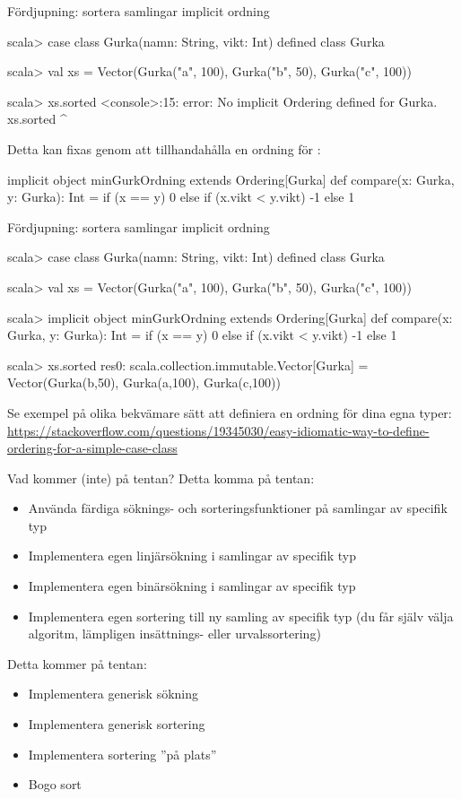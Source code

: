 \begin{Slide}{Fördjupning: sortera samlingar implicit ordning}
\begin{REPL}
scala> case class Gurka(namn: String, vikt: Int)
defined class Gurka

scala> val xs = Vector(Gurka("a", 100), Gurka("b", 50), Gurka("c", 100))

scala> xs.sorted
<console>:15: error: No implicit Ordering defined for Gurka.
       xs.sorted
          ^
\end{REPL}
\pause
Detta kan fixas genom att tillhandahålla en  ordning för :
\begin{Code}
implicit object minGurkOrdning extends Ordering[Gurka] {
  def compare(x: Gurka, y: Gurka): Int =
    if (x == y) 0
    else if (x.vikt < y.vikt) -1
    else 1
}
\end{Code}
\end{Slide}


\begin{Slide}{Fördjupning: sortera samlingar implicit ordning}
\begin{REPL}
scala> case class Gurka(namn: String, vikt: Int)
defined class Gurka

scala> val xs = Vector(Gurka("a", 100), Gurka("b", 50), Gurka("c", 100))

scala> implicit object minGurkOrdning extends Ordering[Gurka] {
         def compare(x: Gurka, y: Gurka): Int =
           if (x == y) 0
           else if (x.vikt < y.vikt) -1
           else 1
       }

scala> xs.sorted
res0: scala.collection.immutable.Vector[Gurka] =
        Vector(Gurka(b,50), Gurka(a,100), Gurka(c,100))
\end{REPL}
{\SlideFontTiny Se exempel på olika bekvämare sätt att definiera en ordning för dina egna typer: 
\url{https://stackoverflow.com/questions/19345030/easy-idiomatic-way-to-define-ordering-for-a-simple-case-class}}
\end{Slide}


\begin{Slide}{Vad kommer (inte) på tentan?}
Detta  komma på tentan:
\begin{itemize}
\item Använda färdiga söknings- och sorteringsfunktioner på samlingar av specifik typ
\item Implementera egen linjärsökning i samlingar av specifik typ
\item Implementera egen binärsökning i samlingar av specifik typ
\item Implementera egen sortering till ny samling av specifik typ (du får själv välja algoritm, lämpligen insättnings- eller urvalssortering)

\end{itemize}
Detta kommer  på tentan:
\begin{itemize}
\item Implementera generisk sökning
\item Implementera generisk sortering
\item Implementera sortering ''på plats''
\item Bogo sort
\end{itemize}
\end{Slide}
